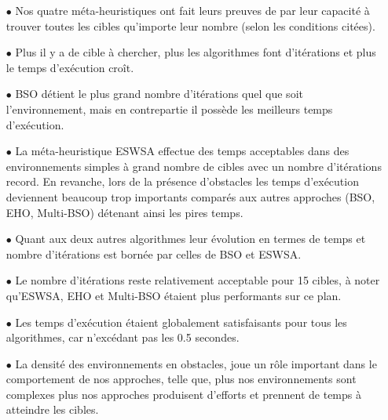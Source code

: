 	\begin{itemize}
	\item[$\bullet$] Nos quatre méta-heuristiques ont fait leurs preuves de par leur capacité à trouver toutes les cibles qu'importe leur nombre (selon les conditions citées).
		
	\item[$\bullet$] Plus il y a de cible à chercher, plus les algorithmes font d'itérations et plus le temps d'exécution croît.
		
     \item[$\bullet$] BSO détient le plus grand nombre d'itérations quel que soit l'environnement, mais en contrepartie il possède les meilleurs temps d'exécution.
    
     \item[$\bullet$] La méta-heuristique ESWSA effectue des temps acceptables dans des environnements simples à grand nombre de cibles avec un nombre d'itérations record. En revanche, lors de la présence d'obstacles les temps d'exécution deviennent beaucoup trop importants comparés aux autres approches (BSO, EHO, Multi-BSO) détenant ainsi les pires temps.
     
     \item[$\bullet$] Quant aux deux autres algorithmes leur évolution en termes de temps et nombre d’itérations est bornée par celles de BSO et ESWSA.

		
	\item[$\bullet$] Le nombre d'itérations reste relativement acceptable pour 15 cibles, à noter qu'ESWSA, EHO et Multi-BSO étaient plus performants sur ce plan.
		
	\item[$\bullet$] Les temps d'exécution étaient globalement satisfaisants pour tous les algorithmes, car n'excédant pas les 0.5 secondes. 
		
	\item[$\bullet$] La densité des environnements en obstacles, joue un rôle important dans le comportement de nos approches, telle que, plus nos environnements sont complexes plus nos approches produisent d'efforts et prennent de temps à atteindre les cibles.
	\end{itemize}
	
	
	
	
	
	
	
